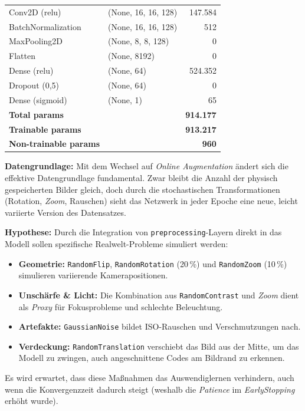 \documentclass[
    a4paper,        %
    11pt,           %
    ngerman,        %
    parskip=half,   %
    listof=totoc,   %
    bibliography=totoc %
]{scrartcl}
\begin{document}
\begin{table}[H]
\begin{tabular}{llr}
        Conv2D (relu) & (None, 16, 16, 128) & 147.584 \\
        BatchNormalization & (None, 16, 16, 128) & 512 \\
        MaxPooling2D & (None, 8, 8, 128) & 0 \\
        Flatten & (None, 8192) & 0 \\
        Dense (relu) & (None, 64) & 524.352 \\
        Dropout (0,5) & (None, 64) & 0 \\
        Dense (sigmoid) & (None, 1) & 65 \\
        \midrule
        \textbf{Total params} & & \textbf{914.177} \\
        \textbf{Trainable params} & & \textbf{913.217} \\
        \textbf{Non-trainable params} & & \textbf{960} \\
        \bottomrule
    \end{tabular}
\end{table}

\textbf{Datengrundlage:}
Mit dem Wechsel auf \textit{Online Augmentation} ändert sich die effektive Datengrundlage fundamental. Zwar bleibt die Anzahl der physisch gespeicherten Bilder gleich, doch durch die stochastischen Transformationen (Rotation, \textit{Zoom}, Rauschen) sieht das Netzwerk in jeder Epoche eine neue, leicht variierte Version des Datensatzes.

\textbf{Hypothese:}
Durch die Integration von \texttt{preprocessing}-Layern direkt in das Modell sollen spezifische Realwelt-Probleme simuliert werden:
\begin{itemize}
    \item \textbf{Geometrie:} \texttt{RandomFlip}, \texttt{RandomRotation} (20\,\%) und \texttt{RandomZoom} (10\,\%) simulieren variierende Kamerapositionen.
    \item \textbf{Unschärfe \& Licht:} Die Kombination aus \texttt{RandomContrast} und \textit{Zoom} dient als \textit{Proxy} für Fokusprobleme und schlechte Beleuchtung.
    \item \textbf{Artefakte:} \texttt{GaussianNoise} bildet ISO-Rauschen und Verschmutzungen nach.
    \item \textbf{Verdeckung:} \texttt{RandomTranslation} verschiebt das Bild aus der Mitte, um das Modell zu zwingen, auch angeschnittene Codes am Bildrand zu erkennen.
\end{itemize}
Es wird erwartet, dass diese Maßnahmen das Auswendiglernen verhindern, auch wenn die Konvergenzzeit dadurch steigt (weshalb die \textit{Patience} im \textit{EarlyStopping} erhöht wurde).
\end{document}
